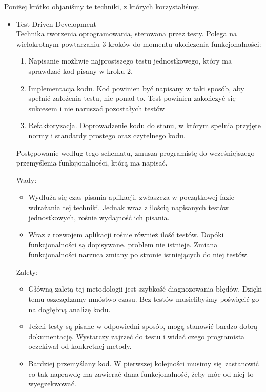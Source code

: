     Poniżej krótko objaniśmy te techniki, z których korzystaliśmy.
    \begin{itemize}
      \item Test Driven Development\cite{tdd} \\
        Technika tworzenia oprogramowania, sterowana przez testy. Polega na wielokrotnym powtarzaniu 3 kroków do momentu ukończenia funkcjonalności:
        \begin{enumerate}
          \item Napisanie możliwie najprostszego testu jednostkowego, który ma sprawdzać kod pisany w kroku 2.
          \item Implementacja kodu. Kod powinien być napisany w taki sposób, aby spełnić założenia testu, nic ponad to. Test powinien zakończyć się sukcesem i nie naruszać pozostałych testów
          \item Refaktoryzacja. Doprowadzenie kodu do stanu, w którym spełnia przyjęte normy i standardy prostego oraz czytelnego kodu\cite{scs}.
        \end{enumerate}

        Postępowanie według tego schematu, zmusza programistę do wcześniejszego przemyślenia funkcjonalności, którą ma napisać.

        Wady:
        \begin{itemize}
          \item Wydłuża się czas pisania aplikacji, zwłaszcza w początkowej fazie wdrażania tej techniki. Jednak wraz z ilością napisanych testów jednostkowych, rośnie wydajność ich pisania.
          \item Wraz z rozwojem aplikacji rośnie również ilość testów. Dopóki funkcjonalności są dopisywane, problem nie istnieje. Zmiana funkcjonalności narzuca zmiany po stronie istniejących do niej testów.
        \end{itemize}

        Zalety:
        \begin{itemize}
          \item Główną zaletą tej metodologii jest szybkość diagnozowania błędów. Dzięki temu oszczędzamy mnóstwo czasu. Bez testów musielibyśmy poświęcić go na dogłębną analizę kodu.
          \item Jeżeli testy są pisane w odpowiedni sposób, mogą stanowić bardzo dobrą dokumentację. Wystarczy zajrzeć do testu i widać czego programista oczekiwał od konkretnej metody.
          \item Bardziej przemyślany kod. W pierwszej kolejności musimy się zastanowić co tak naprawdę ma zawierać dana funkcjonalność, żeby móc od niej to wyegzekwować.
        \end{itemize}


\end{itemize}
